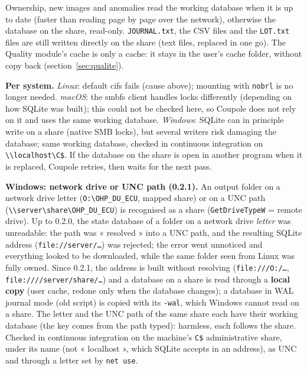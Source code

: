 Ownership, new images and anomalies read the working database when it is up to date (faster than reading page by
page over the network), otherwise the database on the share, read-only. \texttt{JOURNAL.txt}, the CSV files and the
\texttt{LOT.txt} files are still written directly on the share (text files, replaced in one go). The Quality
module's cache is only a cache: it stays in the user's cache folder, without copy back (section~\ref{sec:qualite}).

\textbf{Per system.} \emph{Linux}: default cifs fails (cause above); mounting with \texttt{nobrl} is no longer
needed. \emph{macOS}: the smbfs client handles locks differently (depending on how SQLite was built); this could not
be checked here, so Coupole does not rely on it and uses the same working database. \emph{Windows}: SQLite can in
principle write on a share (native SMB locks), but several writers risk damaging the database; same working
database, checked in continuous integration on \texttt{\textbackslash\textbackslash localhost\textbackslash C\$}. If
the database on the share is open in another program when it is replaced, Coupole retries, then waits for the next
pass.

\textbf{Windows: network drive or UNC path (0.2.1).} An output folder on a network drive letter
(\texttt{O:\textbackslash OHP\_DU\_ECU}, mapped share) or on a UNC path
(\texttt{\textbackslash\textbackslash server\textbackslash share\textbackslash OHP\_DU\_ECU}) is recognised as a share
(\texttt{GetDriveTypeW} = remote drive). Up to 0.2.0, the state database of a folder on a network drive
\emph{letter} was unreadable: the path was « resolved » into a UNC path, and the resulting SQLite address
(\texttt{file://server/…}) was rejected; the error went unnoticed and everything looked to be downloaded, while the
same folder seen from Linux was fully owned. Since 0.2.1, the address is built without resolving
(\texttt{file:///O:/…}, \texttt{file:////server/share/…}) and a database on a share is read through a \textbf{local
copy} (user cache, redone only when the database changes); a database in WAL journal mode (old script) is copied
with its \texttt{-wal}, which Windows cannot read on a share. The letter and the UNC path of the same share each
have their working database (the key comes from the path typed): harmless, each follows the share. Checked in
continuous integration on the machine's \texttt{C\$} administrative share, under its name (not « localhost », which
SQLite accepts in an address), as UNC and through a letter set by \texttt{net use}.

